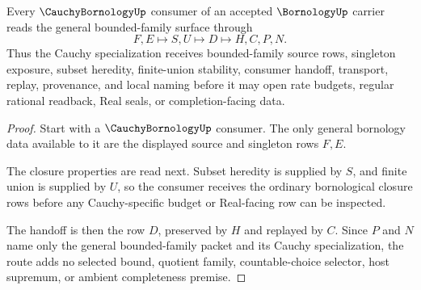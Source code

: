 \begin{theorem}
\label{thm:bornology-cauchy-bornology-handoff}
Every $\CauchyBornologyUp$ consumer of an accepted $\BornologyUp$ carrier reads the general bounded-family surface through
$$
F,E \longmapsto S,U \longmapsto D \longmapsto H,C,P,N .
$$
Thus the Cauchy specialization receives bounded-family source rows, singleton exposure, subset heredity, finite-union stability, consumer handoff, transport, replay, provenance, and local naming before it may open rate budgets, regular rational readback, Real seals, or completion-facing data.
\end{theorem}
\begin{proof}
Start with a $\CauchyBornologyUp$ consumer. The only general bornology data available to it are the displayed source and singleton rows $F,E$.

The closure properties are read next. Subset heredity is supplied by $S$, and finite union is supplied by $U$, so the consumer receives the ordinary bornological closure rows before any Cauchy-specific budget or Real-facing row can be inspected.

The handoff is then the row $D$, preserved by $H$ and replayed by $C$. Since $P$ and $N$ name only the general bounded-family packet and its Cauchy specialization, the route adds no selected bound, quotient family, countable-choice selector, host supremum, or ambient completeness premise.
\end{proof}

